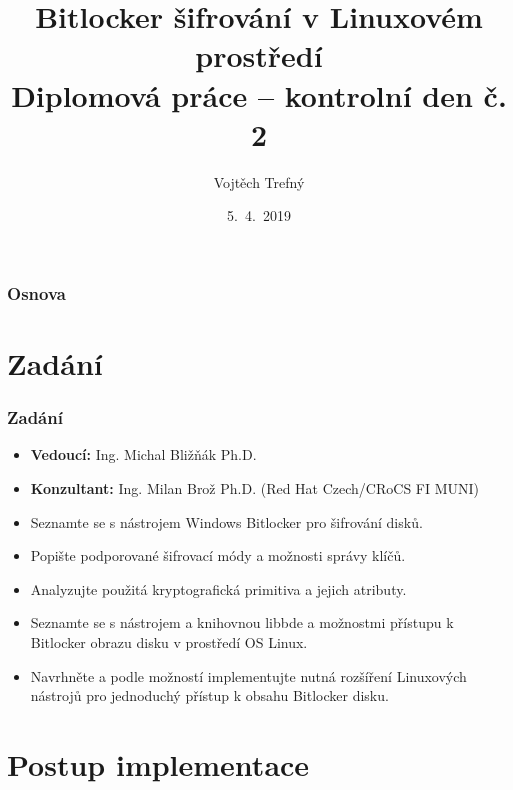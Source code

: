 \documentclass{beamer}
\title[Bitlocker šifrování v Linuxovém prostředí]{Bitlocker šifrování v Linuxovém prostředí\\\small{Diplomová práce -- kontrolní den č. 2}}
\author{Vojtěch Trefný}
\institute[FAI UTB]{Fakulta aplikované informatiky UTB}
\date{5.~4.~2019}
\begin{document}
\begin{frame}
	\titlepage
\end{frame}

\begin{frame}
	\frametitle{Osnova}
	\tableofcontents
\end{frame}


\section{Zadání}

\begin{frame}
	\frametitle{Zadání}
	\begin{block}{}
		\begin{itemize}
			\item \textbf{Vedoucí:} Ing. Michal Bližňák Ph.D.
			\item \textbf{Konzultant:} Ing. Milan Brož Ph.D. (Red Hat Czech/CRoCS FI MUNI)
		\end{itemize}
	\end{block}

	\begin{block}{}
		\begin{itemize}
			\item Seznamte se s nástrojem Windows Bitlocker pro šifrování disků.
			\item Popište podporované šifrovací módy a možnosti správy klíčů.
			\item Analyzujte použitá kryptografická primitiva a jejich atributy.
			\item Seznamte se s nástrojem a knihovnou libbde a možnostmi přístupu k Bitlocker obrazu disku v prostředí OS Linux.
			\item Navrhněte a podle možností implementujte nutná rozšíření Linuxových nástrojů pro jednoduchý přístup k obsahu Bitlocker disku.
		\end{itemize}
	\end{block}

\end{frame}


\section{Postup implementace}
\end{document}

